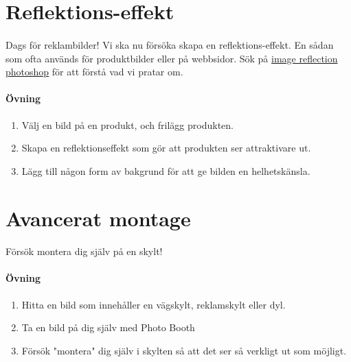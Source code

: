 \documentclass{article}
\begin{document}
  \section{ Reflektions-effekt }
    \paragraph{}
    Dags för reklambilder! Vi ska nu försöka skapa en reflektions-effekt. En sådan som ofta används för produktbilder eller på webbsidor. Sök på \href{https://www.google.se/search?q=engraved+text+photoshop&um=1&ie=UTF-8&hl=sv&tbm=isch&source=og&sa=N&tab=wi&ei=xK4lUsD7DNSQhQep94CYBQ&biw=1280&bih=679&sei=xq4lUuefCMGJhQfghYCoAw#hl=sv&q=image+reflection+photoshop&tbm=isch&um=1}{image reflection photoshop} för att förstå vad vi pratar om.

    \paragraph{ Övning }
      \begin{enumerate}
        \item Välj en bild på en produkt, och frilägg produkten.
        \item Skapa en reflektionseffekt som gör att produkten ser attraktivare ut.
        \item Lägg till någon form av bakgrund för att ge bilden en helhetskänsla.
      \end{enumerate}


  \section{ Avancerat montage }
    \paragraph{}
      Försök montera dig själv på en skylt!
    \paragraph{Övning}
      \begin{enumerate}
        \item Hitta en bild som innehåller en vägskylt, reklamskylt eller dyl.
        \item Ta en bild på dig själv med Photo Booth
        \item Försök "montera" dig själv i skylten så att det ser så verkligt ut som möjligt.
      \end{enumerate}
\end{document}
